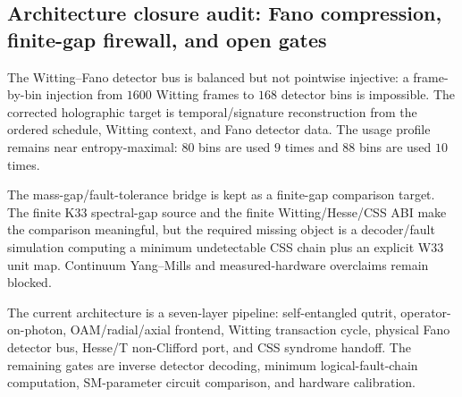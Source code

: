 \subsection{Architecture closure audit: Fano compression, finite-gap firewall, and open gates}
\label{sec:bt1605-bt1607-architecture-closure}

The Witting--Fano detector bus is balanced but not pointwise injective: a frame-by-bin injection from $1600$ Witting frames to $168$ detector bins is impossible.  The corrected holographic target is temporal/signature reconstruction from the ordered schedule, Witting context, and Fano detector data.  The usage profile remains near entropy-maximal: $80$ bins are used $9$ times and $88$ bins are used $10$ times.

The mass-gap/fault-tolerance bridge is kept as a finite-gap comparison target.  The finite K33 spectral-gap source and the finite Witting/Hesse/CSS ABI make the comparison meaningful, but the required missing object is a decoder/fault simulation computing a minimum undetectable CSS chain plus an explicit W33 unit map.  Continuum Yang--Mills and measured-hardware overclaims remain blocked.

The current architecture is a seven-layer pipeline: self-entangled qutrit, operator-on-photon, OAM/radial/axial frontend, Witting transaction cycle, physical Fano detector bus, Hesse/T non-Clifford port, and CSS syndrome handoff.  The remaining gates are inverse detector decoding, minimum logical-fault-chain computation, SM-parameter circuit comparison, and hardware calibration.
